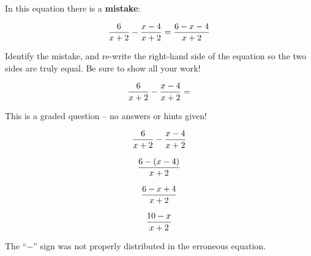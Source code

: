 

In this equation there is a {\bf mistake}:

$${6 \over x + 2} - {{x - 4} \over {x + 2}} = {{6 - x - 4} \over {x + 2}}$$

\vskip 30pt

Identify the mistake, and re-write the right-hand side of the equation so the two sides are truly equal.  Be sure to show all your work!

\vskip 50pt

$${6 \over x + 2} - {{x - 4} \over {x + 2}} = $$

\vfil 

\eject






This is a graded question -- no answers or hints given!







$${6 \over x + 2} - {{x - 4} \over {x + 2}}$$

$${{6  - (x - 4)} \over {x + 2}}$$

$${{6 - x + 4} \over {x + 2}}$$

$${{10 - x} \over {x + 2}}$$

The ``$-$'' sign was not properly distributed in the erroneous equation.





